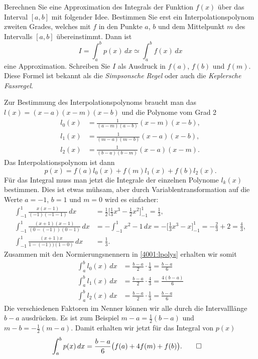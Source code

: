 Berechnen Sie eine Approximation des Integrals der Funktion
$f(x)$ über das Interval $[a,b]$ mit folgender Idee.
Bestimmen Sie erst ein Interpolationspolynom zweiten Grades, welches
mit $f$ in den Punkte $a$, $b$ und dem Mittelpunkt $m$ des Intervalls
$[a,b]$ übereinstimmt.
Dann ist
\[
I=\int_a^b p(x)\,dx
\simeq
\int_a^b f(x)\,dx
\]
eine Approximation.
Schreiben Sie $I$ als Ausdruck in $f(a)$, $f(b)$ und $f(m)$.
Diese Formel ist bekannt als die {\em Simpsonsche Regel} 
oder auch die
{\em Keplersche Fassregel}.


\begin{loesung}
Zur Bestimmung des Interpolationspolynoms braucht man das
$l(x) = (x-a)(x-m)(x-b)$ und die Polynome vom Grad 2
\begin{equation}
\begin{aligned}
l_0(x) &= \frac1{(a-m)(a-b)} (x-m)(x-b),
\\
l_1(x) &= \frac1{(m-a)(m-b)} (x-a)(x-b),
\\
l_2(x) &= \frac1{(b-a)(b-m)} (x-a)(x-m).
\end{aligned}
\label{4001:lpolys}
\end{equation}
Das Interpolationspolynom ist dann
\[
p(x) = f(a) l_0(x) + f(m) l_1(x) + f(b) l_2(x).
\]
Für das Integral muss man jetzt die Integrale der einzelnen Polynome 
$l_k(x)$ bestimmen.
Dies ist etwas mühsam, aber durch Variablentransformation auf
die Werte $a=-1$, $b=1$ und $m=0$ wird es einfacher:
\begin{align*}
\int_{-1}^1 \frac{x(x-1)}{(-1)(-1-1)}\,dx
&=
\frac12
\biggl[\frac13x^3 -\frac12x^2\biggr]_{-1}^1
=
\frac13,
\\
\int_{-1}^1 \frac{(x+1)(x-1)}{(0-(-1))(0-1)}\,dx
&=
-\int_{-1}^1 x^2 -1 \,dx
=
-\biggl[\frac13x^3-x\biggr]_{-1}^1
=
-\frac23 + 2
=
\frac43,
\\
\int_{-1}^1 \frac{(x+1)x}{1-(-1))(1-0)}\,dx
&=
\frac13.
\end{align*}
Zusammen mit den Normierungsnennern in \eqref{4001:lpolys} erhalten wir
somit
\begin{align*}
\int_a^b l_0(x)\,dx
&=
\frac{b-a}{2}
\cdot
\frac13
=
\frac{b-a}6
\\
\int_a^b l_1(x)\,dx
&=
\frac{b-a}{2}
\cdot
\frac{4}{3}
=
\frac{4(b-a)}{6}
\\
\int_a^b l_2(x)\,dx
&=
\frac{b-a}{2}
\cdot
\frac13
=
\frac{b-a}{6}
\end{align*}
Die verschiedenen Faktoren im Nenner können wir alle durch die
Intervalllänge $b-a$ ausdrücken. 
Es ist zum Beispiel $m-a=\frac12(b-a)$ und $m-b=-\frac12(m-a)$.
Damit erhalten wir jetzt für das Integral von $p(x)$
\begin{align*}
\int_a^b p(x)\,dx
&=
\frac{b-a}{6}\bigl(f(a) + 4f(m) + f(b)\bigr).
\qedhere
\end{align*}
\end{loesung}




